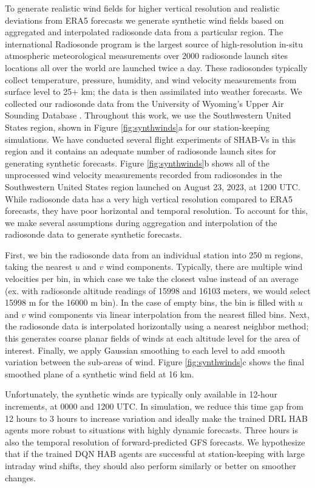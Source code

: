 To generate realistic wind fields for higher vertical resolution and realistic deviations from ERA5 forecasts we generate synthetic wind fields based on aggregated and interpolated radiosonde data from a particular region. The international Radiosonde program is the largest source of high-resolution in-situ atmospheric meteorological measurements over 2000 radiosonde launch sites locations all over the world are launched twice a day. These radiosondes typically collect temperature, pressure, humidity, and wind velocity measurements from surface level to 25+ km; the data is then assimilated into weather forecasts. We collected our radiosonde data from the University of Wyoming's Upper Air Sounding Database \cite{UofWyUpperAir}. Throughout this work, we use the Southwestern United States region, shown in Figure \ref{fig:synthwinds}a for our station-keeping simulations. We have conducted several flight experiments of SHAB-Vs in this region and it contains an adequate number of radiosonde launch sites for generating synthetic forecasts. Figure \ref{fig:synthwinds}b shows all of the unprocessed wind velocity measurements recorded from radiosondes in the Southwestern United States region launched on August 23, 2023, at 1200 UTC. While radiosonde data has a very high vertical resolution compared to ERA5 forecasts,  they have poor horizontal and temporal resolution.  To account for this, we make several assumptions during aggregation and interpolation of the radiosonde data to generate synthetic forecasts.  


First, we bin the radiosonde data from an individual station into 250 m regions, taking the nearest $u$ and $v$ wind components.  Typically, there are multiple wind velocities per bin, in which case we take the closest value instead of an average (ex. with radiosonde altitude readings of 15998 and 16103 meters, we would select 15998 m for the 16000 m bin). In the case of empty bins, the bin is filled with $u$ and $v$ wind components via linear interpolation from the nearest filled bins. Next, the radiosonde data is interpolated horizontally using a nearest neighbor method; this generates coarse planar fields of winds at each altitude level for the area of interest. Finally, we apply Gaussian smoothing to each level to add smooth variation between the sub-areas of wind. Figure \ref{fig:synthwinds}c shows the final smoothed plane of a synthetic wind field at 16 km. 

Unfortunately, the synthetic winds are typically only available in 12-hour increments, at 0000 and 1200 UTC.  In simulation, we reduce this time gap from 12 hours to 3 hours to increase variation and ideally make the trained DRL HAB agents more robust to situations with highly dynamic forecasts. Three hours is also the temporal resolution of forward-predicted GFS forecasts. %
We hypothesize that if the trained DQN HAB agents are successful at station-keeping with large intraday wind shifts, they should also perform similarly or better on smoother changes.


